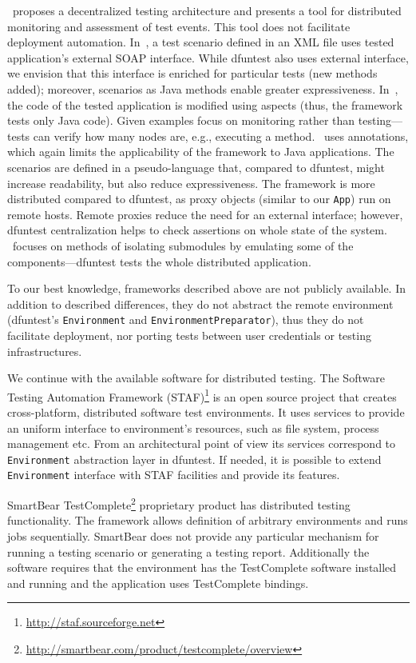 \cite{ulr99}~proposes a decentralized testing architecture and presents a tool for distributed monitoring and assessment of test events. This tool does not facilitate deployment automation.
In~\cite{tsa03}, a test scenario defined in an XML file uses tested application's external SOAP interface. 
While dfuntest also uses external interface, we envision that this interface is enriched for particular tests (new methods  added); moreover, scenarios as Java methods enable greater expressiveness.
In~\cite{hug04}, the code of the tested application is modified using aspects (thus, the framework tests only Java code). 
Given examples focus on monitoring rather than testing---tests can verify how many nodes are, e.g., executing a method.
\cite{de10}~uses annotations, which again limits the applicability of the framework to Java applications. 
The scenarios are defined in a pseudo-language that, compared to dfuntest, might increase readability, but also reduce expressiveness.
The framework is more distributed compared to dfuntest, as proxy objects (similar to our \texttt{App}) run on remote hosts. 
Remote proxies reduce the need for an external interface; 
however, dfuntest centralization helps to check assertions on whole state of the system.
\cite{tor10}~focuses on methods of isolating submodules by emulating some of the components---dfuntest tests the whole distributed application. 

To our best knowledge, frameworks described above are not publicly available. In addition to described differences, they do not abstract the remote environment (dfuntest's \texttt{Environment} and \texttt{EnvironmentPreparator}), thus they do not facilitate deployment, nor porting tests between user credentials or testing infrastructures.

We continue with the available software for distributed testing.
The Software Testing Automation Framework
(STAF)\footnote{\url{http://staf.sourceforge.net}} is an open source project
that creates cross-platform, distributed software test environments.
It uses services to provide an uniform interface to environment's resources,
such as file system, process management etc.
From an architectural point of view its services correspond to
\texttt{Environment} abstraction layer in dfuntest.
If needed, it is possible to extend \texttt{Environment} interface with STAF
facilities and provide its features.

SmartBear
TestComplete\footnote{\url{http://smartbear.com/product/testcomplete/overview}}
proprietary product has distributed testing functionality.
The framework allows definition of arbitrary environments and runs jobs sequentially.
SmartBear does not provide any particular mechanism for running a testing scenario or generating a testing report.
Additionally the software requires that the environment has the TestComplete software installed and running and the application uses TestComplete bindings.

